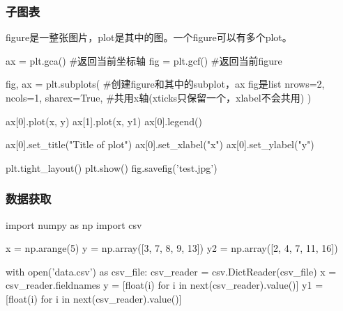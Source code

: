     \subsubsection{子图表}
      figure是一整张图片，plot是其中的图。一个figure可以有多个plot。
      \begin{codeblock}[language=python, caption={subplot}]
        ax = plt.gca() #返回当前坐标轴
        fig = plt.gcf() #返回当前figure

        fig, ax = plt.subplots( #创建figure和其中的subplot，ax fig是list
            nrows=2, ncols=1,
            sharex=True, #共用x轴(xticks只保留一个，xlabel不会共用)
        ) 

        ax[0].plot(x, y)
        ax[1].plot(x, y1)
        ax[0].legend()

        ax[0].set_title("Title of plot")
        ax[0].set_xlabel("x")
        ax[0].set_ylabel("y")

        plt.tight_layout()
        plt.show()
        fig.savefig('test.jpg')
      \end{codeblock}

    \subsubsection{数据获取}
      \begin{codeblock}[language=python, caption={fetch data}]
        import numpy as np
        import csv

        x = np.arange(5)
        y = np.array([3, 7, 8, 9, 13])
        y2 = np.array([2, 4, 7, 11, 16])

        with open('data.csv') as csv_file:
            csv_reader = csv.DictReader(csv_file)
            x = csv_reader.fieldnames
            y = [float(i) for i in next(csv_reader).value()]
            y1 = [float(i) for i in next(csv_reader).value()]
      \end{codeblock}

